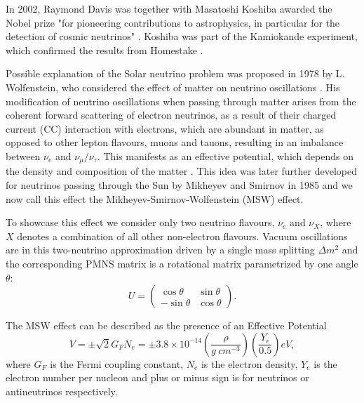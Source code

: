 In 2002, Raymond Davis was together with Masatoshi Koshiba awarded the Nobel prize "for pioneering contributions to astrophysics, in particular for the detection of cosmic neutrinos" \cite{Nobel}. Koshiba was part of the Kamiokande experiment, which confirmed the results from Homestake \cite{Kamiokande96.pdf}.

Possible explanation of the Solar neutrino problem was proposed in 1978 by L. Wolfenstein, who considered the effect of matter on neutrino oscillations \cite{Wolfenstein78.pdf}. His modification of neutrino oscillations when passing through matter arises from the coherent forward scattering of electron neutrinos, as a result of their charged current (CC) interaction with electrons, which are abundant in matter, as opposed to other lepton flavours, muons and tauons, resulting in an imbalance between $\nu_e$ and $\nu_{\mu}/\nu_{\tau}$. This manifests as an effective potential, which depends on the density and composition of the matter \cite{Wolfenstein78.pdf}. This idea was later further developed for neutrinos passing through the Sun by Mikheyev and Smirnov in 1985 \cite{MikheyevSmirnov85.pdf}\cite{Gonzalez-GarciaNuMassesAndMixing.pdf} and we now call this effect the Mikheyev-Smirnov-Wolfenstein (MSW) effect.

To showcase this effect we consider only two neutrino flavours, $\nu_e$ and $\nu_X$, where $X$ denotes a combination of all other non-electron flavours. Vacuum oscillations are in this two-neutrino approximation driven by a single mass splitting $\Delta m^2$ and the corresponding PMNS matrix is a rotational matrix parametrized by one angle $\theta$:
\begin{equation}
U=
\begin{pmatrix}
 \cos\theta  & \sin\theta    \\
 -\sin\theta & \cos\theta
\end{pmatrix}.
\end{equation}

The MSW effect can be described as the presence of an Effective Potential \cite{CERNSchool2001.pdf}
\begin{equation}
V=\pm\sqrt{2}G_{F}N_{e}=\pm 3.8\times 10^{-14}\left(\frac{\rho}{\unit{g}\ \unit{cm^{-3}}}\right)\left(\frac{Y_e}{0.5}\right)\unit{eV},
\end{equation}
where $G_F$ is the Fermi coupling constant, $N_e$ is the electron density, $Y_e$ is the electron number per nucleon and plus or minus sign is for neutrinos or antineutrinos respectively.

